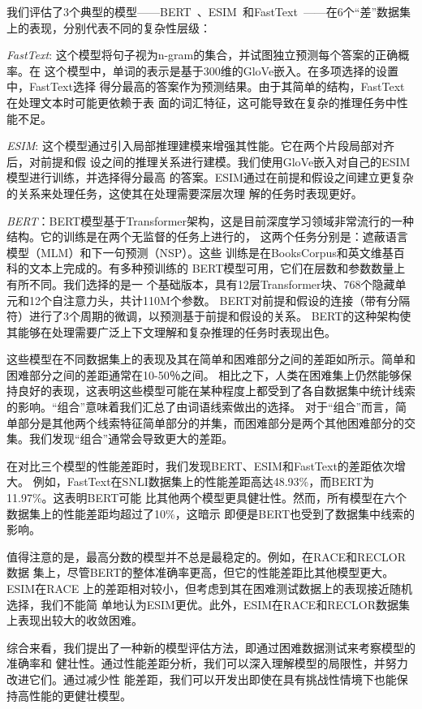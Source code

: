 我们评估了3个典型的模型——BERT~\cite{devlin2018bert}、ESIM~\cite{chen2017enhanced}和FastText~\cite{joulin2017bag}——在6个``差''数据集上的表现，分别代表不同的复杂性层级：

\textit{FastText}: 这个模型将句子视为n-gram的集合，并试图独立预测每个答案的正确概率。在
这个模型中，单词的表示是基于300维的GloVe嵌入。在多项选择的设置中，FastText选择
得分最高的答案作为预测结果。由于其简单的结构，FastText在处理文本时可能更依赖于表
面的词汇特征，这可能导致在复杂的推理任务中性能不足。

\textit{ESIM}: 这个模型通过引入局部推理建模来增强其性能。它在两个片段局部对齐后，对前提和假
设之间的推理关系进行建模。我们使用GloVe嵌入对自己的ESIM模型进行训练，并选择得分最高
的答案。ESIM通过在前提和假设之间建立更复杂的关系来处理任务，这使其在处理需要深层次理
解的任务时表现更好。

\textit{BERT}：BERT模型基于Transformer架构，这是目前深度学习领域非常流行的一种结构。它的训练是在两个无监督的任务上进行的，
这两个任务分别是：遮蔽语言模型（MLM）和下一句预测（NSP）。这些
训练是在BooksCorpus和英文维基百科的文本上完成的。有多种预训练的
BERT模型可用，它们在层数和参数数量上有所不同。我们选择的是一
个基础版本，具有12层Transformer块、768个隐藏单元和12个自注意力头，共计110M个参数。
BERT对前提和假设的连接（带有分隔符）进行了3个周期的微调，以预测基于前提和假设的关系。
BERT的这种架构使其能够在处理需要广泛上下文理解和复杂推理的任务时表现出色。


这些模型在不同数据集上的表现及其在简单和困难部分之间的差距如所示。简单和困难部分之间的差距通常在10-50％之间。
相比之下，人类在困难集上仍然能够保持良好的表现，这表明这些模型可能在某种程度上都受到了各自数据集中统计线索的影响。``组合''意味着我们汇总了由词语线索做出的选择。
对于``组合''而言，简单部分是其他两个线索特征简单部分的并集，而困难部分是两个其他困难部分的交集。我们发现``组合''通常会导致更大的差距。

在对比三个模型的性能差距时，我们发现BERT、ESIM和FastText的差距依次增大。
例如，FastText在SNLI数据集上的性能差距高达48.93\%，而BERT为11.97\%。这表明BERT可能
比其他两个模型更具健壮性。然而，所有模型在六个数据集上的性能差距均超过了10\%，这暗示
即便是BERT也受到了数据集中线索的影响。

值得注意的是，最高分数的模型并不总是最稳定的。例如，在RACE和RECLOR数据
集上，尽管BERT的整体准确率更高，但它的性能差距比其他模型更大。ESIM在RACE
上的差距相对较小，但考虑到其在困难测试数据上的表现接近随机选择，我们不能简
单地认为ESIM更优。此外，ESIM在RACE和RECLOR数据集上表现出较大的收敛困难。

综合来看，我们提出了一种新的模型评估方法，即通过困难数据测试来考察模型的准确率和
健壮性。通过性能差距分析，我们可以深入理解模型的局限性，并努力改进它们。通过减少性
能差距，我们可以开发出即使在具有挑战性情境下也能保持高性能的更健壮模型。

